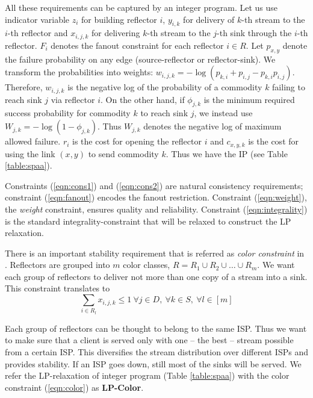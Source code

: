 All these requirements can be captured by an integer program. Let us use indicator variable $z_{i}$ for building reflector $i$, $y_{i,k}$ for delivery of $k$-th stream to the $i$-th reflector and $x_{i,j,k}$  for delivering $k$-th stream to the $j$-th sink through the $i$-th reflector. $F_{i}$ denotes the fanout constraint for each reflector $i \in R$. Let $p_{x,y}$ denote the failure probability on any edge (source-reflector or reflector-sink). We transform the probabilities into weights: $w_{i,j,k}=-\log{(p_{k,i}+p_{i,j}-p_{k,i}p_{i,j})}$. Therefore, $w_{i,j,k}$ is the negative log of the probability of a commodity $k$  failing to reach sink $j$ via reflector $i$. On the other hand, if $\phi_{j,k}$ is the minimum required success probability for commodity $k$ to reach sink $j$, we instead use $W_{j,k}=-\log{(1-\phi_{j,k})}$. Thus $W_{j,k}$ denotes the negative log of maximum allowed failure. $r_i$ is the cost for opening the reflector $i$ and $c_{x,y,k}$ is the cost for using the link $(x,y)$ to send commodity $k$. Thus we have the IP (see Table \ref{table:spaa}).

Constraints (\ref{eqn:cons1}) and (\ref{eqn:cons2}) are natural consistency
requirements; constraint (\ref{eqn:fanout}) encodes the fanout restriction.
Constraint (\ref{eqn:weight}), the \emph{weight} constraint, ensures
quality and reliability. Constraint (\ref{eqn:integrality}) is the standard
integrality-constraint that will be relaxed to construct the LP relaxation.

There is an important  stability requirement that is referred as \emph{color constraint} in \cite{DBLP:conf/spaa/AndreevMMS03}. Reflectors are grouped into $m$ color classes, $R=R_{1} \cup R_{2} \cup \ldots \cup R_{m}$. We want each group of reflectors to deliver not more than one copy of a stream into a sink. This constraint translates to
\begin{equation}
\label{eqn:color}
\sum_{i \in R_{l}} x_{i,j,k} \leq 1~\forall j \in D, ~\forall k \in S, ~\forall l \in [m]
\end{equation}

Each group of reflectors can be thought to belong to the same ISP. Thus we want to make sure that a client is served only with one -- the best -- stream possible from a certain ISP. This diversifies the stream distribution over different ISPs and provides stability. If an ISP goes down, still most of the sinks will be served. We refer the LP-relaxation of  integer program
(Table \ref{table:spaa}) with the color constraint (\ref{eqn:color})
as \textbf{LP-Color}.

